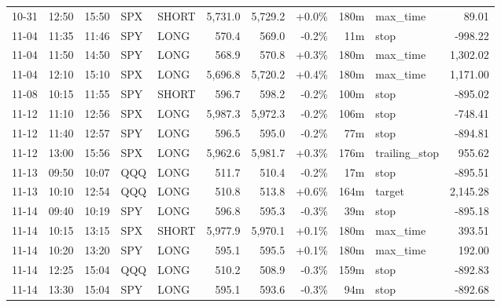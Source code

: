 \documentclass[11pt,a4paper,twoside]{article}
\begin{document}
\begin{center}
\begin{longtable}{>{\color{txtmain}}l l l l l r r r r >{\color{txtmain}}l r}
10-31 & 12:50 & 15:50 & SPX & SHORT & 5,731.0 & 5,729.2 & \textcolor{wingreen}{+0.0\%} & 180m & max\_time & \textcolor{wingreen}{89.01} \\
11-04 & 11:35 & 11:46 & SPY & LONG & 570.4 & 569.0 & \textcolor{lossred}{-0.2\%} & 11m & stop & \textcolor{lossred}{-998.22} \\
11-04 & 11:50 & 14:50 & SPY & LONG & 568.9 & 570.8 & \textcolor{wingreen}{+0.3\%} & 180m & max\_time & \textcolor{wingreen}{1,302.02} \\
11-04 & 12:10 & 15:10 & SPX & LONG & 5,696.8 & 5,720.2 & \textcolor{wingreen}{+0.4\%} & 180m & max\_time & \textcolor{wingreen}{1,171.00} \\
11-08 & 10:15 & 11:55 & SPY & SHORT & 596.7 & 598.2 & \textcolor{lossred}{-0.2\%} & 100m & stop & \textcolor{lossred}{-895.02} \\
11-12 & 11:10 & 12:56 & SPX & LONG & 5,987.3 & 5,972.3 & \textcolor{lossred}{-0.2\%} & 106m & stop & \textcolor{lossred}{-748.41} \\
11-12 & 11:40 & 12:57 & SPY & LONG & 596.5 & 595.0 & \textcolor{lossred}{-0.2\%} & 77m & stop & \textcolor{lossred}{-894.81} \\
11-12 & 13:00 & 15:56 & SPX & LONG & 5,962.6 & 5,981.7 & \textcolor{wingreen}{+0.3\%} & 176m & trailing\_stop & \textcolor{wingreen}{955.62} \\
11-13 & 09:50 & 10:07 & QQQ & LONG & 511.7 & 510.4 & \textcolor{lossred}{-0.2\%} & 17m & stop & \textcolor{lossred}{-895.51} \\
11-13 & 10:10 & 12:54 & QQQ & LONG & 510.8 & 513.8 & \textcolor{wingreen}{+0.6\%} & 164m & target & \textcolor{wingreen}{2,145.28} \\
11-14 & 09:40 & 10:19 & SPY & LONG & 596.8 & 595.3 & \textcolor{lossred}{-0.3\%} & 39m & stop & \textcolor{lossred}{-895.18} \\
11-14 & 10:15 & 13:15 & SPX & SHORT & 5,977.9 & 5,970.1 & \textcolor{wingreen}{+0.1\%} & 180m & max\_time & \textcolor{wingreen}{393.51} \\
11-14 & 10:20 & 13:20 & SPY & LONG & 595.1 & 595.5 & \textcolor{wingreen}{+0.1\%} & 180m & max\_time & \textcolor{wingreen}{192.00} \\
11-14 & 12:25 & 15:04 & QQQ & LONG & 510.2 & 508.9 & \textcolor{lossred}{-0.3\%} & 159m & stop & \textcolor{lossred}{-892.83} \\
11-14 & 13:30 & 15:04 & SPY & LONG & 595.1 & 593.6 & \textcolor{lossred}{-0.3\%} & 94m & stop & \textcolor{lossred}{-892.68} \\

\end{longtable}
\end{center}
\end{document}

